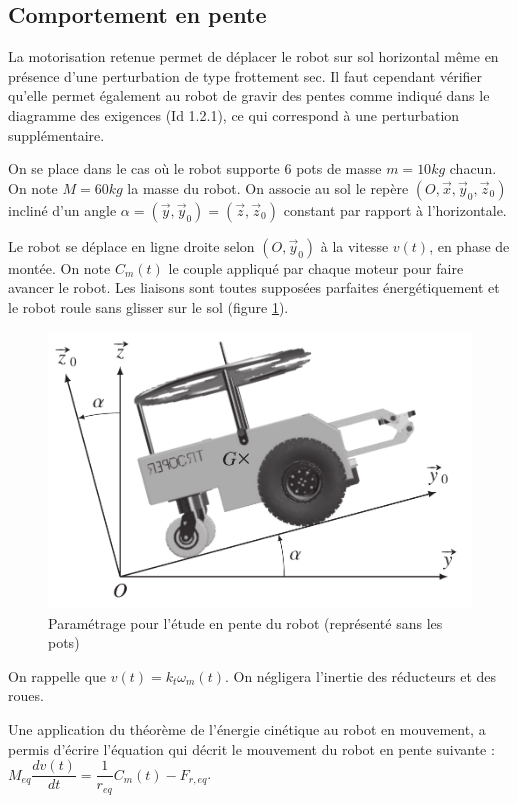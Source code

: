 \subsection{Comportement en pente}

La motorisation retenue permet de déplacer le robot sur sol horizontal même en présence d'une perturbation de type frottement sec. Il faut cependant vérifier qu'elle permet également au robot de gravir des pentes comme indiqué dans le diagramme des exigences (Id 1.2.1), ce qui correspond à une perturbation supplémentaire.

On se place dans le cas où le robot supporte 6 pots de masse $m=10kg$ chacun. On note $M=60kg$ la masse du robot. On associe au sol le repère $(O, \vec{x}, \vec{y}_0, \vec{z}_0)$ incliné d'un angle $\alpha=(\vec{y},\vec{y}_0)=(\vec{z},\vec{z}_0)$
constant par rapport à l'horizontale.

Le robot se déplace en ligne droite selon  $(O, \vec{y}_0)$ à la vitesse $v(t)$, en phase de montée. On note $C_m(t)$ le couple appliqué par chaque moteur pour faire avancer le robot. Les liaisons sont toutes supposées parfaites énergétiquement et le robot roule sans glisser sur le sol (figure \ref{fig07}).

\newpage

\begin{figure}[ht!]
\begin{center}
 \includegraphics[width=0.7\linewidth]{img/fig07}
\end{center}
\caption{Paramétrage pour l'étude en pente du robot (représenté sans les pots)}
\label{fig07}
\end{figure}

On rappelle que $v(t)=k_t \omega_m(t)$. On négligera l'inertie des réducteurs et des roues.

Une application du théorème de l'énergie cinétique au robot en mouvement, a permis d'écrire l'équation qui décrit le mouvement du robot en pente suivante :\\ 
$M_{eq}\dfrac{dv(t)}{dt}=\dfrac{1}{r_{eq}}C_m(t)-F_{r,eq}$.

